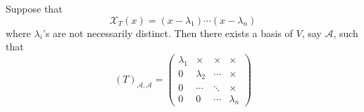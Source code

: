 \begin{proposition}\label{pro:7:12}
Suppose that 
\[
\mathcal{X}_T(x) = (x-\lambda_1)\cdots(x-\lambda_n)
\]
where $\lambda_i$'s are not necessarily distinct.
Then there exists a basis of $V$, say $\mathcal{A}$, such that
\[
(T)_{\mathcal{A},\mathcal{A}}=
\begin{pmatrix}
\lambda_1&\times&\times&\times\\
0&\lambda_2&\cdots&\times\\
0&\cdots&\ddots&\times\\
0&0&\cdots&\lambda_n
\end{pmatrix}
\]
\end{proposition}

